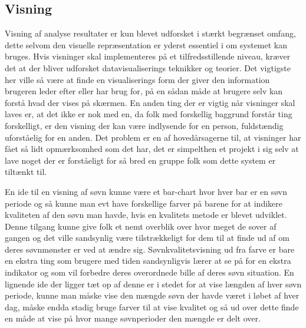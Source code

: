 \subsection{Visning}
Visning af analyse resultater er kun blevet udforsket i stærkt begrænset omfang, dette selvom den visuelle repræsentation er yderst essentiel i om systemet kan bruges.
Hvis visninger skal implementeres på et tilfredsstillende niveau, kræver det at der bliver udforsket datavisualiserings teknikker og teorier.
Det vigtigste her ville så være at finde en visualiserings form der giver den information brugeren leder efter eller har brug for, på en sådan måde at brugere selv kan forstå hvad der vises på skærmen.
En anden ting der er vigtig når visninger skal laves er, at det ikke er nok med en, da folk med forskellig baggrund forstår ting forskelligt, er den visning der kan være indlysende for en person, fuldstændig uforståelig for en anden.
Det problem er en af hovedårsagerne til, at visninger har fået så lidt opmærksomhed som det har, det er simpelthen et projekt i sig selv at lave noget der er forståeligt for så bred en gruppe folk som dette system er tiltænkt til.

En ide til en visning af søvn kunne være et bar-chart hvor hver bar er en søvn periode og så kunne man evt have forskellige farver på barene for at indikere kvaliteten af den søvn man havde, hvis en kvalitets metode er blevet udviklet.
Denne tilgang kunne give folk et nemt overblik over hvor meget de sover af gangen og det ville sandsynlig være tilstrækkeligt for dem til at finde ud af om deres søvnmønster er ved at ændre sig.
Søvnkvalitetsvisning ud fra farve er bare en ekstra ting som brugere med tiden sandsynligvis lærer at se på for en ekstra indikator og som vil forbedre deres overordnede bille af deres søvn situation.
En lignende ide der ligger tæt op af denne er i stedet for at vise længden af hver søvn periode, kunne man måske vise den mængde søvn der havde været i løbet af hver dag, måske endda stadig bruge farver til at vise kvalitet og så ud over dette finde en måde at vise på hvor mange søvnperioder den mængde er delt over.

